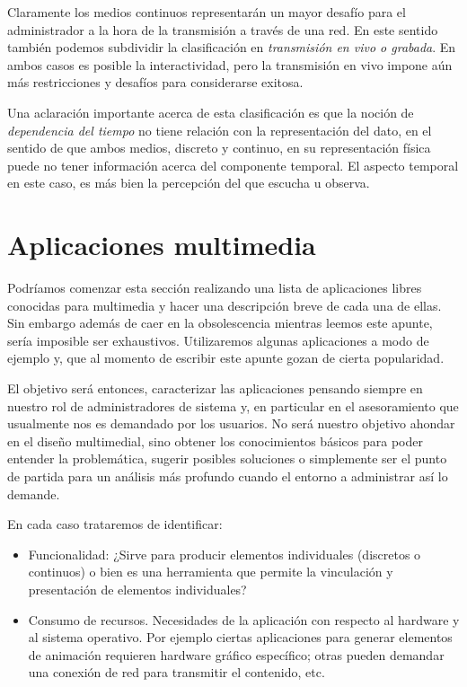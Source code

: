 \documentclass[12pt]{article}
\begin{document}
Claramente los medios continuos representarán un mayor desafío para el 
administrador a la hora de la transmisión a través de una red. En este 
sentido también podemos subdividir la clasificación en {\it transmisión
en vivo o grabada}. En ambos casos es posible la interactividad, pero 
la transmisión en vivo impone aún más restricciones y desafíos para 
considerarse exitosa. 

Una aclaración importante acerca de esta clasificación es que la noción 
de {\it dependencia del tiempo} no tiene relación con la representación
del dato, en el sentido de que ambos medios, discreto y continuo, en su 
representación física puede no tener información acerca del componente 
temporal. El aspecto temporal en este caso, es más bien la percepción del 
que escucha u observa.\cite{ramyer}  

\section*{Aplicaciones multimedia}

Podríamos comenzar esta sección realizando una lista de aplicaciones 
libres conocidas para multimedia y hacer una descripción breve de cada
una de ellas. Sin embargo además de caer en la obsolescencia mientras 
leemos este apunte, sería imposible ser exhaustivos. Utilizaremos 
algunas aplicaciones a modo de ejemplo y, que al momento de escribir este 
apunte gozan de cierta popularidad.  

El objetivo será entonces, caracterizar las aplicaciones pensando
siempre en nuestro rol de administradores de sistema y, en particular 
en el asesoramiento que usualmente nos es demandado por los usuarios. No
será nuestro objetivo ahondar en el diseño multimedial, sino obtener 
los conocimientos básicos para poder entender la problemática, sugerir 
posibles soluciones o simplemente ser el punto de partida para un análisis 
más profundo cuando el entorno a administrar así lo demande. 

En cada caso trataremos de identificar: 
\begin{itemize}
\item Funcionalidad: ¿Sirve para producir elementos individuales (discretos o continuos) o 
bien es una herramienta que permite la vinculación y presentación de elementos individuales? 
\item Consumo de recursos. Necesidades de la aplicación con respecto al 
hardware y al sistema operativo. Por ejemplo ciertas aplicaciones para generar 
elementos de animación requieren hardware gráfico específico; otras pueden demandar 
una conexión de red para transmitir el contenido, etc. 
\end{itemize}
\end{document}
